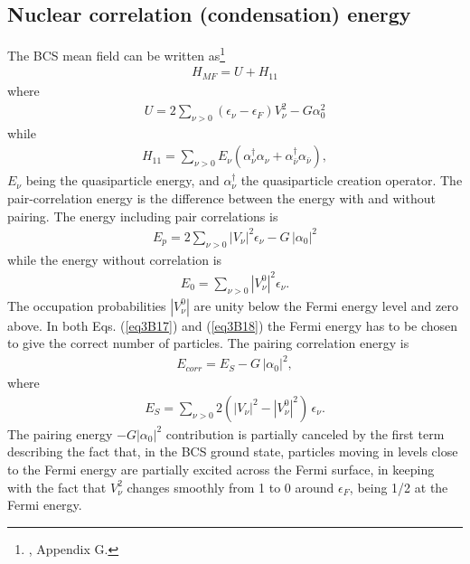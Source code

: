 \subsection{Nuclear correlation (condensation) energy}\label{App3B4}
The BCS mean field can be written as\footnote{\cite{Brink:05}, Appendix G.}
 \begin{align}\label{eq3B14}
H_{MF}=U+H_{11}
 \end{align} 
where
 \begin{align}\label{eq3B15}
 U=2\sum_{\nu>0}(\epsilon_\nu-\epsilon_F)V_\nu^2-G\alpha_0^2
 \end{align} 
while
 \begin{align}\label{eq3B16}
H_{11}=\sum_{\nu>0}E_\nu(\alpha_\nu^\dagger\alpha_\nu+\alpha_{\bar\nu}^\dagger\alpha_{\bar\nu}),
 \end{align} 
$E_\nu$ being the quasiparticle energy, and $\alpha^\dagger_\nu$ the quasiparticle creation operator. The pair-correlation energy is the difference between the energy with and without pairing. The energy including pair correlations is
 \begin{align}\label{eq3B17}
E_p=2\sum_{\nu>0}|V_\nu|^2\epsilon_\nu-G\,|\alpha_0|^2
 \end{align} 
 while the energy without correlation is
  \begin{align}\label{eq3B18}
  E_0=\sum_{\nu>0}|V^0_\nu|^2\epsilon_\nu.
  \end{align} 
 The occupation probabilities $|V^0_\nu|$ are unity below the Fermi energy level and zero above. In both Eqs. (\ref{eq3B17}) and (\ref{eq3B18}) the Fermi energy has to be chosen to give the correct number of particles. The pairing correlation energy is 
   \begin{align}\label{eq3B19}
E_{corr}=E_S-G\,|\alpha_0|^2,
   \end{align} 
 where
   \begin{align}\label{eq3B20}
E_S=\sum_{\nu>0}2(|V_\nu|^2-|V^0_\nu|^2)\,\epsilon_\nu.
   \end{align}  
 The  pairing energy $-G|\alpha_0|^2$ contribution is partially canceled by the first term describing the fact that, in the BCS ground state, particles moving in levels close to the Fermi energy are partially excited across the Fermi surface, in keeping with the fact that $V_\nu^2$ changes smoothly from 1 to 0 around $\epsilon_F$, being 1/2 at the Fermi energy.
 
